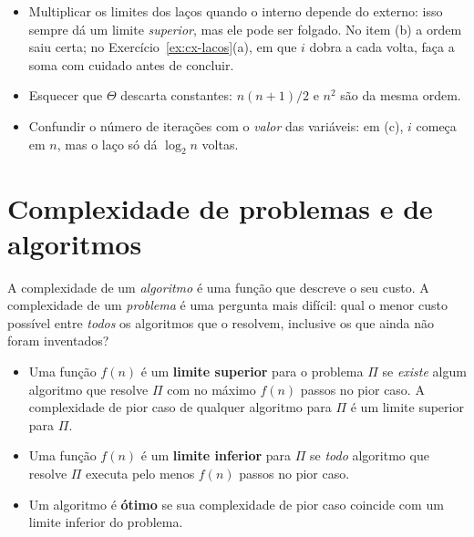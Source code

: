 \begin{cuidado}
\begin{itemize}
  \item Multiplicar os limites dos laços quando o interno depende do externo: isso sempre dá um limite \emph{superior}, mas ele pode ser folgado. No item (b) a ordem saiu certa; no Exercício~\ref{ex:cx-lacos}(a), em que $i$ dobra a cada volta, faça a soma com cuidado antes de concluir.
  \item Esquecer que $\Theta$ descarta constantes: $n(n+1)/2$ e $n^2$ são da mesma ordem.
  \item Confundir o número de iterações com o \emph{valor} das variáveis: em (c), $i$ começa em $n$, mas o laço só dá $\log_2 n$ voltas.
\end{itemize}
\end{cuidado}

\section{Complexidade de problemas e de algoritmos}\label{sec:problemas}
A complexidade de um \emph{algoritmo} é uma função que descreve o seu custo. A complexidade de um \emph{problema} é uma pergunta mais difícil: qual o menor custo possível entre \emph{todos} os algoritmos que o resolvem, inclusive os que ainda não foram inventados?

\begin{defi}\leavevmode
\begin{itemize}
  \item Uma função $f(n)$ é um \textbf{limite superior} para o problema $\Pi$ se \emph{existe} algum algoritmo que resolve $\Pi$ com no máximo $f(n)$ passos no pior caso. A complexidade de pior caso de qualquer algoritmo para $\Pi$ é um limite superior para $\Pi$.
  \item Uma função $f(n)$ é um \textbf{limite inferior} para $\Pi$ se \emph{todo} algoritmo que resolve $\Pi$ executa pelo menos $f(n)$ passos no pior caso.
  \item Um algoritmo é \textbf{ótimo} se sua complexidade de pior caso coincide com um limite inferior do problema.
\end{itemize}
\end{defi}

